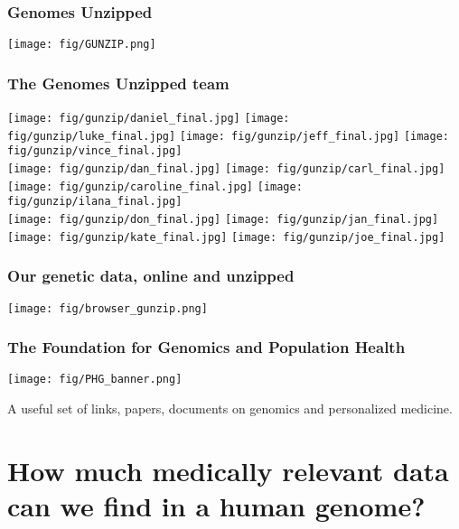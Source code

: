 \documentclass{beamer}
\begin{document}
\begin{frame}
\frametitle{Genomes Unzipped}
  \begin{center}
    \texttt{[image: fig/GUNZIP.png]}
  \end{center}
\end{frame}



\begin{frame}
\frametitle{The Genomes Unzipped team}
  \begin{center}
    \texttt{[image: fig/gunzip/daniel\_final.jpg]}
    \texttt{[image: fig/gunzip/luke\_final.jpg]}
    \texttt{[image: fig/gunzip/jeff\_final.jpg]}
    \texttt{[image: fig/gunzip/vince\_final.jpg]}\\
    \texttt{[image: fig/gunzip/dan\_final.jpg]}
    \texttt{[image: fig/gunzip/carl\_final.jpg]}
    \texttt{[image: fig/gunzip/caroline\_final.jpg]}
    \texttt{[image: fig/gunzip/ilana\_final.jpg]}\\
    \texttt{[image: fig/gunzip/don\_final.jpg]}
    \texttt{[image: fig/gunzip/jan\_final.jpg]}
    \texttt{[image: fig/gunzip/kate\_final.jpg]}
    \texttt{[image: fig/gunzip/joe\_final.jpg]}
  \end{center}
\end{frame}


\begin{frame}
\frametitle{Our genetic data, online and unzipped}
  \begin{center}
    \texttt{[image: fig/browser\_gunzip.png]}
  \end{center}
\end{frame}



\begin{frame}
\frametitle{The Foundation for Genomics and Population Health}
  \begin{center}
    \texttt{[image: fig/PHG\_banner.png]}
  \end{center}
  A useful set of links, papers, documents on genomics and personalized medicine.
\end{frame}




\section{How much medically relevant data can we find in a human genome?}
\end{document}

